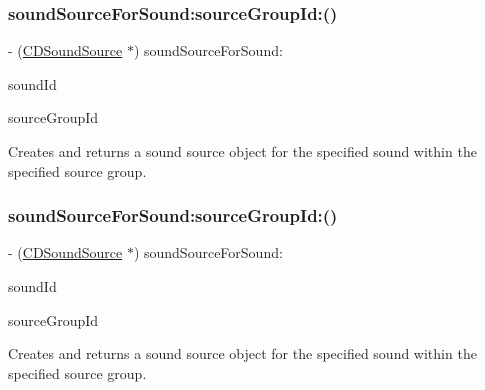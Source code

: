 \subsubsection{\texorpdfstring{sound\+Source\+For\+Sound\+:source\+Group\+Id\+:()}{soundSourceForSound:sourceGroupId:()}\hspace{0.1cm}{\footnotesize\ttfamily [2/4]}}
{\footnotesize\ttfamily -\/ (\hyperlink{interfaceCDSoundSource}{C\+D\+Sound\+Source} $\ast$) sound\+Source\+For\+Sound\+: \begin{DoxyParamCaption}\item[{(int)}]{sound\+Id }\item[{sourceGroupId:(int)}]{source\+Group\+Id }\end{DoxyParamCaption}}

Creates and returns a sound source object for the specified sound within the specified source group. \mbox{\label{interfaceCDSoundEngine_ab0c372cb85df05a4070b8f8bd2213efd}} 
\subsubsection{\texorpdfstring{sound\+Source\+For\+Sound\+:source\+Group\+Id\+:()}{soundSourceForSound:sourceGroupId:()}\hspace{0.1cm}{\footnotesize\ttfamily [3/4]}}
{\footnotesize\ttfamily -\/ (\hyperlink{interfaceCDSoundSource}{C\+D\+Sound\+Source} $\ast$) sound\+Source\+For\+Sound\+: \begin{DoxyParamCaption}\item[{(int)}]{sound\+Id }\item[{sourceGroupId:(int)}]{source\+Group\+Id }\end{DoxyParamCaption}}

Creates and returns a sound source object for the specified sound within the specified source group. \mbox{\label{interfaceCDSoundEngine_ab0c372cb85df05a4070b8f8bd2213efd}} 
